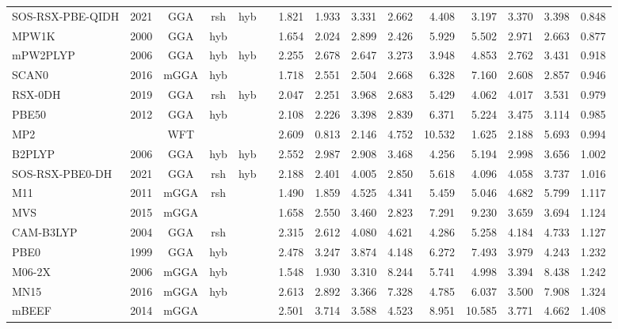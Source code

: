 \begin{landscape}
\begin{longtable}[c]{lc:cccc:rrrr:rr:rr:c}
SOS-RSX-PBE-QIDH & 2021 & GGA  & rsh & hyb &     & 1.821 & 1.933 & 3.331  & 2.662  & 4.408  & 3.197  & 3.370  & 3.398  & 0.848 \\
MPW1K            & 2000 & GGA  & hyb &     &     & 1.654 & 2.024 & 2.899  & 2.426  & 5.929  & 5.502  & 2.971  & 2.663  & 0.877 \\
mPW2PLYP         & 2006 & GGA  & hyb & hyb &     & 2.255 & 2.678 & 2.647  & 3.273  & 3.948  & 4.853  & 2.762  & 3.431  & 0.918 \\
SCAN0            & 2016 & mGGA & hyb &     &     & 1.718 & 2.551 & 2.504  & 2.668  & 6.328  & 7.160  & 2.608  & 2.857  & 0.946 \\
RSX-0DH          & 2019 & GGA  & rsh & hyb &     & 2.047 & 2.251 & 3.968  & 2.683  & 5.429  & 4.062  & 4.017  & 3.531  & 0.979 \\
PBE50            & 2012 & GGA  & hyb &     &     & 2.108 & 2.226 & 3.398  & 2.839  & 6.371  & 5.224  & 3.475  & 3.114  & 0.985 \\
MP2              &      & WFT  &     &     &     & 2.609 & 0.813 & 2.146  & 4.752  & 10.532 & 1.625  & 2.188  & 5.693  & 0.994 \\
B2PLYP           & 2006 & GGA  & hyb & hyb &     & 2.552 & 2.987 & 2.908  & 3.468  & 4.256  & 5.194  & 2.998  & 3.656  & 1.002 \\
SOS-RSX-PBE0-DH  & 2021 & GGA  & rsh & hyb &     & 2.188 & 2.401 & 4.005  & 2.850  & 5.618  & 4.096  & 4.058  & 3.737  & 1.016 \\
M11              & 2011 & mGGA & rsh &     &     & 1.490 & 1.859 & 4.525  & 4.341  & 5.459  & 5.046  & 4.682  & 5.799  & 1.117 \\
MVS              & 2015 & mGGA &     &     &     & 1.658 & 2.550 & 3.460  & 2.823  & 7.291  & 9.230  & 3.659  & 3.694  & 1.124 \\
CAM-B3LYP        & 2004 & GGA  & rsh &     &     & 2.315 & 2.612 & 4.080  & 4.621  & 4.286  & 5.258  & 4.184  & 4.733  & 1.127 \\
PBE0             & 1999 & GGA  & hyb &     &     & 2.478 & 3.247 & 3.874  & 4.148  & 6.272  & 7.493  & 3.979  & 4.243  & 1.232 \\
M06-2X           & 2006 & mGGA & hyb &     &     & 1.548 & 1.930 & 3.310  & 8.244  & 5.741  & 4.998  & 3.394  & 8.438  & 1.242 \\
MN15             & 2016 & mGGA & hyb &     &     & 2.613 & 2.892 & 3.366  & 7.328  & 4.785  & 6.037  & 3.500  & 7.908  & 1.324 \\
mBEEF            & 2014 & mGGA &     &     &     & 2.501 & 3.714 & 3.588  & 4.523  & 8.951  & 10.585 & 3.771  & 4.662  & 1.408 \\

\end{longtable}
\end{landscape}
